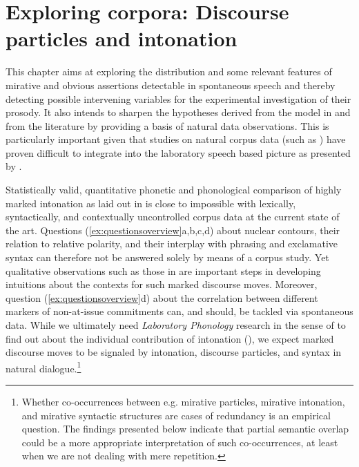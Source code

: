 
\chapter{Exploring corpora: Discourse particles and intonation} %

\label{ch:5} %


This chapter aims at exploring the distribution and some relevant features of mirative and obvious assertions detectable in spontaneous speech and thereby detecting possible intervening variables for the experimental investigation of their prosody. It also intends to sharpen the hypotheses derived from the model in  and from the literature by providing a basis of natural data observations. This is particularly important given that studies on natural corpus data (such as \cite{CanteroSerenaFontRotches.2007,MartinButraguenoVelazquez.2018}) have proven difficult to integrate into the laboratory speech based picture as presented by \citet{HualdePrieto2015}.

Statistically valid, quantitative phonetic and phonological comparison of high\-ly marked intonation as laid out in  is close to impossible with lexically, syntactically, and contextually uncontrolled corpus data at the current state of the art. Questions (\ref{ex:questionsoverview}a,b,c,d) about nuclear contours, their relation to relative polarity, and their interplay with phrasing and exclamative syntax can therefore not be answered solely by means of a corpus study. Yet qualitative observations such as those in  are important steps in developing intuitions about the contexts for such marked discourse moves. Moreover, question (\ref{ex:questionsoverview}d) about the correlation between different markers of non-at-issue commitments can, and should, be tackled via spontaneous data. While we ultimately need \textit{Laboratory Phonology} research in the sense of \citet{CohnFougeronHuffman.2012intro} to find out about the individual contribution of intonation (), we expect marked discourse moves to be signaled by intonation, discourse particles, and syntax in natural dialogue.\footnote{Whether co-occurrences between e.g. mirative particles, mirative intonation, and mirative syntactic structures are cases of redundancy is an empirical question. The findings presented below indicate that partial semantic overlap could be a more appropriate interpretation of such co-occurrences, at least when we are not dealing with mere repetition.}


